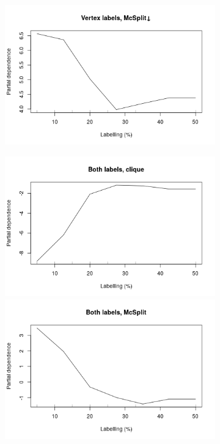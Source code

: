\documentclass{l4proj}
\theoremstyle{definition}
\theoremstyle{remark}
\begin{document}
\begin{figure}
\begin{subfigure}[t]{0.49\textwidth}
    \includegraphics[width=\textwidth]{images/vertex_labels_mcsplitdown_labelling.png}
  \end{subfigure}
  \begin{subfigure}[t]{0.49\textwidth}
    \centering
    \includegraphics[width=\textwidth]{images/both_labels_clique_labelling.png}
    \includegraphics[width=\textwidth]{images/both_labels_mcsplit_labelling.png}

\end{subfigure}
\end{figure}
\end{document}
